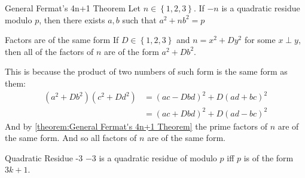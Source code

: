 \theo{}
{General Fermat's 4n+1 Theorem}{
    Let $n\in \left\{1, 2, 3\right\}$. If $-n$ is a quadratic residue modulo
    $p$, then there exists $a, b$ such that $a^2 + nb^2 = p$
}

\thmbox{}
{Factors are of the same form}{
    If $D\in \left\{1, 2, 3\right\}$ and $n = x^2 + Dy^2$ for some $x\perp y$,
    then all of the factors of $n$ are of the form $a^2 + Db^2$.
}

\begin{prooof}
    This is because the product of two numbers of such form is the same form
    as them:
    \[\begin{aligned}
        \left(a^2+Db^2\right)\left(c^2 + Dd^2\right) &=\left(ac-Dbd\right)^2 +
        D\left(ad+bc\right)^2\\
        &=\left(ac+Dbd\right)^2 + D\left(ad-bc\right)^2
    \end{aligned}\] 
    And by \autoref{theorem:General Fermat's 4n+1 Theorem} the prime factors
    of $n$ are of the same form. And so all factors of $n$ are of the same form.
\end{prooof}


\thmbox{}
{Quadratic Residue -3}{
    $-3$ is a quadratic residue of modulo $p$ iff $p$ is of the form $3k+1$.
}
